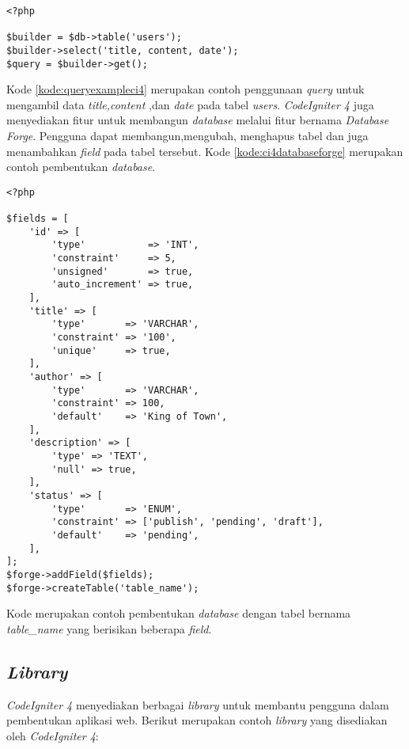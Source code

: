 \begin{lstlisting}[caption=Contoh konfigurasi \textit{database} pada \textit{CodeIgniter 4}. ,label=kode:queryexampleci4]
<?php

$builder = $db->table('users');
$builder->select('title, content, date');
$query = $builder->get();
\end{lstlisting}
Kode \ref{kode:queryexampleci4} merupakan contoh penggunaan \textit{query} untuk mengambil data \textit{title,content} ,dan \textit{date} pada tabel \textit{users}. \textit{CodeIgniter 4} juga menyediakan fitur untuk membangun \textit{database} melalui fitur bernama \textit{Database Forge}. Pengguna dapat membangun,mengubah, menghapus tabel dan juga menambahkan \textit{field} pada tabel tersebut. Kode \ref{kode:ci4databaseforge} merupakan contoh pembentukan \textit{database}.
\begin{lstlisting}[caption=Contoh pembentukan tabel melalui \textit{database forge}. ,label=kode:ci4databaseforge]
<?php

$fields = [
    'id' => [
        'type'           => 'INT',
        'constraint'     => 5,
        'unsigned'       => true,
        'auto_increment' => true,
    ],
    'title' => [
        'type'       => 'VARCHAR',
        'constraint' => '100',
        'unique'     => true,
    ],
    'author' => [
        'type'       => 'VARCHAR',
        'constraint' => 100,
        'default'    => 'King of Town',
    ],
    'description' => [
        'type' => 'TEXT',
        'null' => true,
    ],
    'status' => [
        'type'       => 'ENUM',
        'constraint' => ['publish', 'pending', 'draft'],
        'default'    => 'pending',
    ],
];
$forge->addField($fields);
$forge->createTable('table_name');
\end{lstlisting}
Kode merupakan contoh pembentukan \textit{database} dengan tabel bernama \textit{table\_name} yang berisikan beberapa \textit{field}.

\subsection{\textit{Library}}
\textit{CodeIgniter 4} menyediakan berbagai \textit{library} untuk membantu pengguna dalam pembentukan aplikasi web. Berikut merupakan contoh \textit{library} yang disediakan oleh \textit{CodeIgniter 4}:
